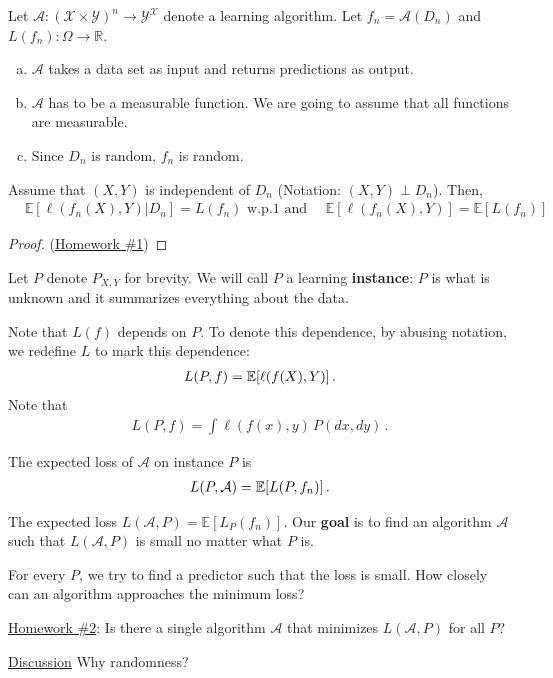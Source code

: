 \documentclass[twoside]{article}
\begin{document}
\begin{definition}
    Let $\mathcal{A}: (\mathcal{X}\times \mathcal{Y})^n \rightarrow \mathcal{Y}^\mathcal{X}$ denote a learning algorithm. Let $f_n=\mathcal{A}(D_n)$ and $L(f_n): \Omega \rightarrow \mathbb{R}$.
\end{definition}

\begin{remark}\mbox{}
\begin{enumerate}[(a)]
\item  $\mathcal{A}$ takes a data set as input and returns predictions as output.
\item $\mathcal{A}$ has to be a measurable function. We are going to assume that all functions are measurable. 
\item Since $D_n$ is random, $f_n$ is random.
\end{enumerate}
\end{remark}


\begin{proposition} 
Assume that $(X,Y)$ is independent of $D_n$ (Notation: $(X,Y) \perp D_n$). Then,
\begin{align*}
    & \mathbb{E}[ \ell \left( f_n(X),Y \right) | D_n ] = L(f_n)\text{ w.p.1  and } \quad
    \mathbb{E}[ \ell \left( f_n(X),Y \right) ] = \mathbb{E} [L(f_n)]\,
\end{align*}
\end{proposition}
\begin{proof}
    (\underline{Homework \#1})
\end{proof}

Let $P$ denote $P_{X,Y}$ for brevity. We will call $P$ a learning \textbf{instance}: $P$ is what is unknown and it summarizes everything about the data.

Note that $L(f)$ depends on $P$. To denote this dependence, by abusing notation, we redefine
$L$ to mark this dependence:
\begin{align*}
L(P,f) = \mathbb{E}[ \ell(f(X),Y) ]\,.
\end{align*}
Note that
\begin{align*}
L(P,f) = \int \ell(f(x),y) \, P(dx,dy)\,.
\end{align*}

\begin{definition}
The expected loss  of $\mathcal{A}$ on instance $P$ is 
\begin{align*}
L(P,\mathcal{A} ) = \mathbb{E}[L(P,f_n)]\,.
\end{align*}
\end{definition}

The expected loss $L(\mathcal{A},P ) = \mathbb{E} [L_{P }(f_n)]$. 
Our {\bf goal} is to find an algorithm $\mathcal{A}$ such that $L(\mathcal{A}, P )$ is small no matter what $P$ is.

For every $P$, we try to find a predictor such that the loss is small. How closely can an algorithm approaches the minimum loss?

\noindent 
\underline{Homework \#2}: Is there a single algorithm $\mathcal{A}$ that minimizes $L(\mathcal{A},P)$ for all $P$?

\noindent
\underline{Discussion} Why randomness?
\end{document}

